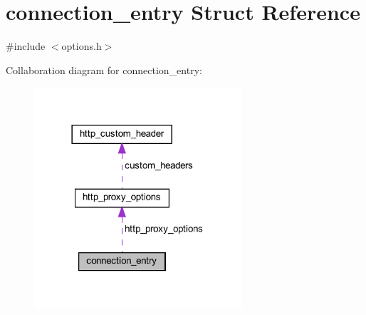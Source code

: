 \hypertarget{structconnection__entry}{}\section{connection\+\_\+entry Struct Reference}
\label{structconnection__entry}


{\ttfamily \#include $<$options.\+h$>$}



Collaboration diagram for connection\+\_\+entry\+:
\nopagebreak
\begin{figure}[H]
\begin{center}
\leavevmode
\includegraphics[width=218pt]{structconnection__entry__coll__graph}
\end{center}
\end{figure}
